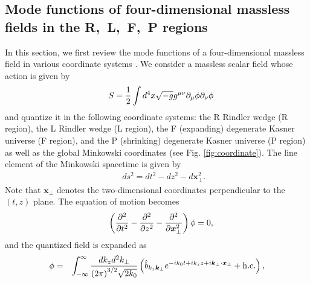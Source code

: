 \documentclass[aps,prd,preprintnumbers,nofootinbib,showpacs,11pt]{revtex4}%
\begin{document}
\begin{widetext}
\section{Mode functions of four-dimensional massless fields in the {\rm R},~{\rm L},~{\rm F},~{\rm P} regions}
In this section, we first review the mode functions of a four-dimensional massless field in various
coordinate systems \cite{Higuchi}. 
We consider a massless scalar field whose action is given by 
\begin{eqnarray}
&&S={1\over 2}\int d^4x\sqrt{-g}g^{\mu\nu}\partial_\mu \phi\partial_\nu \phi
\label{fourdaction}
\end{eqnarray}
and quantize it in the following coordinate systems: the R Rindler 
wedge (R region), the L Rindler wedge (L region), the F (expanding) degenerate Kasner 
universe (F region), and the P (shrinking) degenerate Kasner universe (P region)
as well as the global Minkowski coordinates 
 (see Fig. \ref{fig:coordinate}).
The line element of the Minkowski spacetime is given by
\begin{eqnarray}
&&ds^2=dt^2-dz^2-d\bm x_\perp^2.
\label{fourdle}
\end{eqnarray}
Note that $\bm x_\perp$ denotes the two-dimensional coordinates perpendicular
to the $(t,z)$ plane.  
The equation of motion becomes
\begin{eqnarray}
&&\left({\partial^2\over \partial t^2}-{\partial^2\over \partial z^2}-
{\partial^2\over \partial \bm x_\perp^2}\right)\phi=0,
\label{fourdee}
\end{eqnarray}
and the quantized field is expanded as
\begin{eqnarray}
\phi&=&\int_{-\infty}^{\infty} {dk_zd^2k_\perp\over {(2\pi)}^{3/2}\sqrt{2k_0}}
\left( {\hat b}_{k_z\bm k_\perp}e^{-ik_0 t+ik_zz+i{\bm k}_\perp\cdot{\bm x}_\perp}
+{\rm h.c.}
\right)
, 
\end{eqnarray}

\end{widetext}
\end{document}
